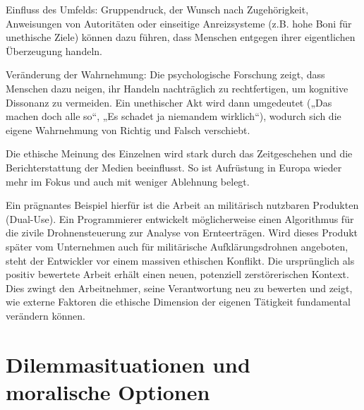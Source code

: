 \documentclass[
    12pt,               %
    a4paper,            %
    ngerman             %
]{scrartcl}
\begin{document}
\begin{description}
    \item Einfluss des Umfelds: Gruppendruck, der Wunsch nach Zugehörigkeit, Anweisungen von Autoritäten oder einseitige Anreizsysteme (z.B. hohe Boni für unethische Ziele) können dazu führen, dass Menschen entgegen ihrer eigentlichen Überzeugung handeln.

    \item Veränderung der Wahrnehmung: Die psychologische Forschung zeigt, dass Menschen dazu neigen, ihr Handeln nachträglich zu rechtfertigen, um kognitive Dissonanz zu vermeiden. Ein unethischer Akt wird dann umgedeutet („Das machen doch alle so“, „Es schadet ja niemandem wirklich“), wodurch sich die eigene Wahrnehmung von Richtig und Falsch verschiebt.

    \item Die ethische Meinung des Einzelnen wird stark durch das Zeitgeschehen und die Berichterstattung der  Medien  beeinflusst. So ist Aufrüstung in Europa wieder mehr im Fokus und auch mit weniger Ablehnung belegt.
\end{description}

Ein prägnantes Beispiel hierfür ist die Arbeit an militärisch nutzbaren Produkten (Dual-Use). Ein Programmierer entwickelt möglicherweise einen Algorithmus für die zivile Drohnensteuerung zur Analyse von Ernteerträgen. Wird dieses Produkt später vom Unternehmen auch für militärische Aufklärungsdrohnen angeboten, steht der Entwickler vor einem massiven ethischen Konflikt. Die ursprünglich als positiv bewertete Arbeit erhält einen neuen, potenziell zerstörerischen Kontext. Dies zwingt den Arbeitnehmer, seine Verantwortung neu zu bewerten und zeigt, wie externe Faktoren die ethische Dimension der eigenen Tätigkeit fundamental verändern können.


\section{Dilemmasituationen und moralische Optionen}

\end{document}
